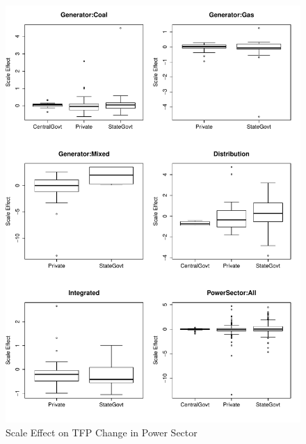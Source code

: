 \begin{figure}[h]
\centering
\caption{Scale Effect on TFP Change in Power Sector}
	\label{fig:ScaleChange}
	\includegraphics[width=1.00\textwidth]{chapter02/ScaleChange.pdf}	
\end{figure}

